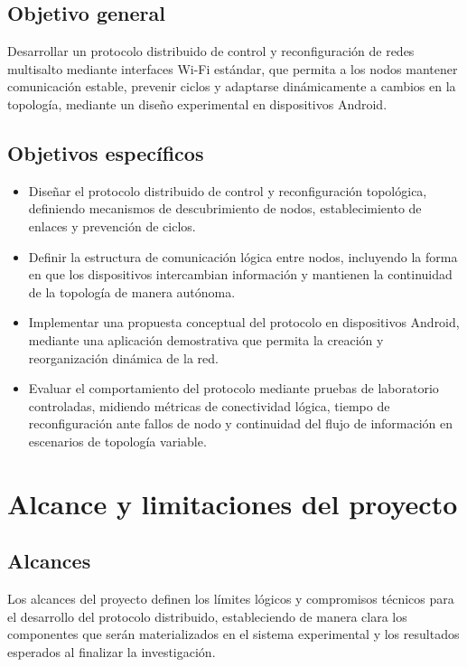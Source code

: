 \documentclass[12pt,oneside]{scrreprt}
\begin{document}
\subsection{Objetivo general}

Desarrollar un protocolo distribuido de control y reconfiguración de redes multisalto mediante interfaces Wi-Fi estándar, que permita a los nodos mantener comunicación estable, prevenir ciclos y adaptarse dinámicamente a cambios en la topología, mediante un diseño experimental en dispositivos Android.

\subsection{Objetivos específicos}

\begin{itemize}
\item Diseñar el protocolo distribuido de control y reconfiguración topológica, definiendo mecanismos de descubrimiento de nodos, establecimiento de enlaces y prevención de ciclos.
\item Definir la estructura de comunicación lógica entre nodos, incluyendo la forma en que los dispositivos intercambian información y mantienen la continuidad de la topología de manera autónoma.
\item Implementar una propuesta conceptual del protocolo en dispositivos Android, mediante una aplicación demostrativa que permita la creación y reorganización dinámica de la red.
\item Evaluar el comportamiento del protocolo mediante pruebas de laboratorio controladas, midiendo métricas de conectividad lógica, tiempo de reconfiguración ante fallos de nodo y continuidad del flujo de información en escenarios de topología variable.
\end{itemize}

\section{Alcance y limitaciones del proyecto}

\subsection{Alcances}

Los alcances del proyecto definen los límites lógicos y compromisos técnicos para el desarrollo del protocolo distribuido, estableciendo de manera clara los componentes que serán materializados en el sistema experimental y los resultados esperados al finalizar la investigación.
\end{document}
